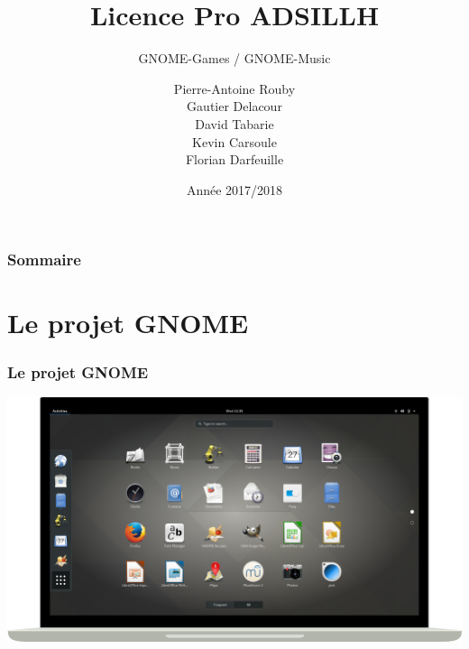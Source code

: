 \documentclass{beamer}
\title{Licence Pro ADSILLH}
\subtitle{GNOME-Games / GNOME-Music}
\author{Pierre-Antoine Rouby\\Gautier Delacour\\
  David Tabarie\\Kevin Carsoule\\Florian Darfeuille}
\date{Année 2017/2018}
\begin{document}
\frame{\titlepage}

\begin{frame}
  \frametitle{Sommaire}
  \tableofcontents
\end{frame}

\section{Le projet GNOME}
\begin{frame}
  \frametitle{Le projet GNOME}
  \includegraphics[scale=0.2]{images/GnomeScreen.png}
\end{frame}
\end{document}
